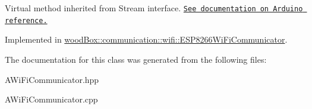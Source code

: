 Virtual method inherited from Stream interface. \href{https://www.arduino.cc/en/Serial/Write}{\tt See documentation on Arduino reference.} 

Implemented in \mbox{\hyperlink{classwood_box_1_1communication_1_1wifi_1_1_e_s_p8266_wi_fi_communicator_a6bb904e5302da7ec3fefc6e9a896f5f8}{wood\+Box\+::communication\+::wifi\+::\+E\+S\+P8266\+Wi\+Fi\+Communicator}}.



The documentation for this class was generated from the following files\+:\begin{DoxyCompactItemize}
\item 
A\+Wi\+Fi\+Communicator.\+hpp\item 
A\+Wi\+Fi\+Communicator.\+cpp\end{DoxyCompactItemize}
